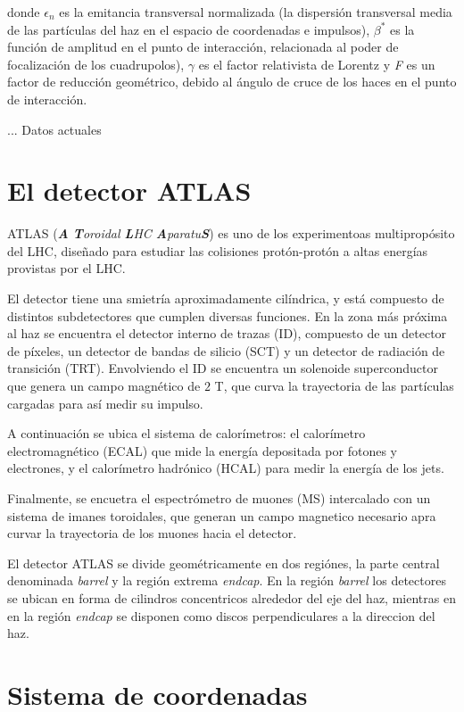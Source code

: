 donde $\epsilon_{n}$ es la emitancia transversal normalizada (la dispersión transversal media de las partículas del  haz en el espacio de coordenadas e impulsos), $\beta^{*}$ es la función de amplitud en el punto de interacción, relacionada al poder de focalización de los cuadrupolos), $\gamma$ es el factor relativista de Lorentz y \textit{F} es un factor de reducción geométrico, debido al ángulo de cruce de los haces en el punto de interacción.

... Datos actuales

\section{El detector ATLAS}

ATLAS (\textit{\textbf{A} \textbf{T}oroidal \textbf{L}HC \textbf{A}paratu\textbf{S}}) es uno de los experimentoas multipropósito del LHC, diseñado para estudiar las colisiones protón-protón a altas energías provistas por el LHC.

El detector tiene una smietría aproximadamente cilíndrica, y está compuesto de distintos subdetectores que cumplen diversas funciones. En la zona más próxima al haz se encuentra el detector interno de trazas (ID), compuesto de un detector de píxeles, un detector de bandas de silicio (SCT) y un detector de radiación de transición (TRT). Envolviendo el ID se encuentra un solenoide superconductor que genera un campo magnético de $2$ T, que curva la trayectoria de las partículas cargadas para así medir su impulso.

A continuación se ubica el sistema de calorímetros: el calorímetro electromagnético (ECAL) que mide la energía depositada por fotones y electrones, y el calorímetro hadrónico (HCAL) para medir la energía de los jets.

Finalmente, se encuetra el espectrómetro de muones (MS) intercalado con un sistema de imanes toroidales, que generan un campo magnetico necesario apra curvar la trayectoria de los muones hacia el detector.

El detector ATLAS se divide geométricamente en dos regiónes, la parte central denominada \textit{barrel} y la región extrema \textit{endcap}. En la región \textit{barrel} los detectores se ubican en forma de cilindros concentricos alrededor del eje del haz, mientras en en la región \textit{endcap} se disponen como discos perpendiculares a la direccion del haz. 

\section{Sistema de coordenadas}

